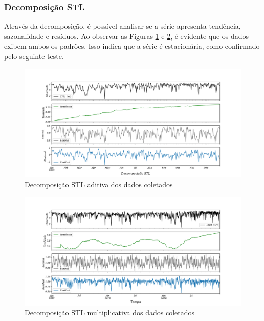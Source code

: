 \subsubsection{Decomposi\c c\~ao STL}\label{subsubsec:stl}




Através da decomposição, é possível analisar se a série apresenta tendência, sazonalidade e resíduos. Ao observar as Figuras \ref{fig:stl-aditiva} e \ref{fig:stl}, é evidente que os dados exibem ambos os padrões. Isso indica que a série é estacionária, como confirmado pelo seguinte teste.

\begin{figure}[!htb]
	\centering
	\caption{Decomposição STL aditiva dos dados coletados}
	\label{fig:stl-aditiva}
	\includegraphics[width=1\linewidth]{"Resultados/Figuras/STL aditiva"}
	
	
\end{figure}

\begin{figure}[!htb]
	\centering
	\caption{Decomposição STL multiplicativa dos dados coletados}
	\label{fig:stl}
	\includegraphics[width=1\linewidth]{Resultados/Figuras/STL}
		
	
	
\end{figure}



